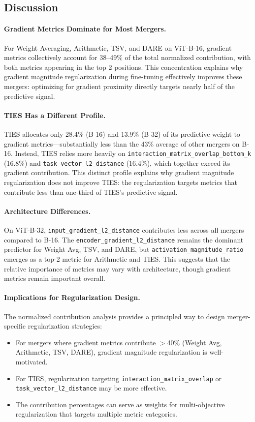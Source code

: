 \subsection{Discussion}

\paragraph{Gradient Metrics Dominate for Most Mergers.}
For Weight Averaging, Arithmetic, TSV, and DARE on ViT-B-16, gradient metrics collectively account for 38--49\% of the total normalized contribution, with both metrics appearing in the top 2 positions. This concentration explains why gradient magnitude regularization during fine-tuning effectively improves these mergers: optimizing for gradient proximity directly targets nearly half of the predictive signal.

\paragraph{TIES Has a Different Profile.}
TIES allocates only 28.4\% (B-16) and 13.9\% (B-32) of its predictive weight to gradient metrics---substantially less than the 43\% average of other mergers on B-16. Instead, TIES relies more heavily on \texttt{interaction\_matrix\_overlap\_bottom\_k} (16.8\%) and \texttt{task\_vector\_l2\_distance} (16.4\%), which together exceed its gradient contribution. This distinct profile explains why gradient magnitude regularization does not improve TIES: the regularization targets metrics that contribute less than one-third of TIES's predictive signal.

\paragraph{Architecture Differences.}
On ViT-B-32, \texttt{input\_gradient\_l2\_distance} contributes less across all mergers compared to B-16. The \texttt{encoder\_gradient\_l2\_distance} remains the dominant predictor for Weight Avg, TSV, and DARE, but \texttt{activation\_magnitude\_ratio} emerges as a top-2 metric for Arithmetic and TIES. This suggests that the relative importance of metrics may vary with architecture, though gradient metrics remain important overall.

\paragraph{Implications for Regularization Design.}
The normalized contribution analysis provides a principled way to design merger-specific regularization strategies:
\begin{itemize}
    \item For mergers where gradient metrics contribute $>$40\% (Weight Avg, Arithmetic, TSV, DARE), gradient magnitude regularization is well-motivated.
    \item For TIES, regularization targeting \texttt{interaction\_matrix\_overlap} or \texttt{task\_vector\_l2\_distance} may be more effective.
    \item The contribution percentages can serve as weights for multi-objective regularization that targets multiple metric categories.
\end{itemize}

